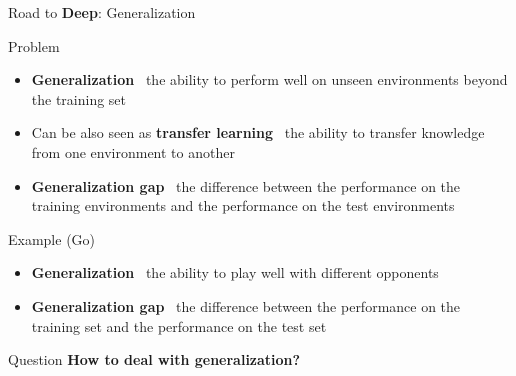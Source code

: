 \documentclass[presentation, 9pt]{beamer}\mode<presentation>{\usetheme{AMSBolognaFC}}
\begin{document}
\begin{frame}{Road to \textbf{Deep}: Generalization}
\begin{block}{Problem}
	\begin{itemize}
		\item \textbf{Generalization} \faArrowRight \, the ability to perform well on unseen environments beyond the training set
		\item Can be also seen as \textbf{transfer learning} \faArrowRight \, the ability to transfer knowledge from one environment to another
		\item \textbf{Generalization gap} \faArrowRight \, the difference between the performance on the training environments and the performance on the test environments
	\end{itemize}
\end{block}
\begin{block}{Example (Go)}
	\begin{itemize}
		\item \textbf{Generalization} \faArrowRight \, the ability to play well with different opponents
		\item \textbf{Generalization gap} \faArrowRight \, the difference between the performance on the training set and the performance on the test set
	\end{itemize}
\end{block}
\begin{alertblock}{Question}
	\centering
	\textbf{How to deal with generalization?}
\end{alertblock}
\end{frame}
\end{document}

